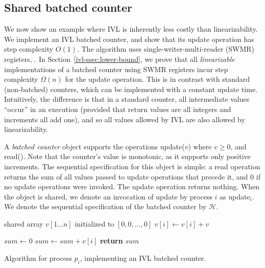 \subsection{Shared batched counter}
\label{ivl-ssec:adder}

We now show an example where IVL is inherently less costly than linearizability.
We implement an IVL batched counter, and show that its {\sc update} operation
has step complexity $O(1)$. The algorithm uses single-writer-multi-reader (SWMR) registers, .
In Section~\ref{ivl-ssec:lower-bound}, we prove that all \emph{linearizable} implementations
of a batched counter using SWMR registers incur step complexity $\Omega(n)$ for the {\sc update} operation.
This is in contrast with standard (non-batched) counters, which can be implemented with
a constant update time. Intuitively, the difference is that in a standard counter,
all intermediate values ``occur'' in an execution (provided that return values are
all integers and increments all add one),  and so all values allowed by IVL are also
allowed by linearizability.


A \emph{batched counter} object supports the operations {\sc update}($v$) where $v \geq 0$, and {\sc read}().
Note that the counter's value is monotonic, as it supports only positive increments.
The sequential specification for this object is simple: a {\sc read} operation returns the sum of all values passed to {\sc update}
operations that precede it, and $0$ if no {\sc update} operations were invoked. The {\sc update} operation returns nothing. When the
object is shared, we denote an invocation of {\sc update} by process $i$ as {\sc update}$_i$. We denote the sequential specification
of the batched counter by ${\mathcal H}$.

\begin{algorithm}
    \begin{algorithmic}[1]

        \State shared array $v[1 \dots n]$ initialized to $\left[0,0,\dots,0\right]$
        \State $v[i] \gets v[i] + v$ \label{ivl-alg:ivl-adder:l:inc}
        \EndProcedure


        \State $\mathit{sum} \gets 0$
        \State $\mathit{sum} \gets \mathit{sum} + v[i]$
        \EndFor
        \State \textbf{return} $\mathit{sum}$
        \EndProcedure
    \end{algorithmic}
    \caption{Algorithm for process $p_i$, implementing an IVL batched counter.}
    \label{ivl-alg:ivl-adder}
\end{algorithm}

